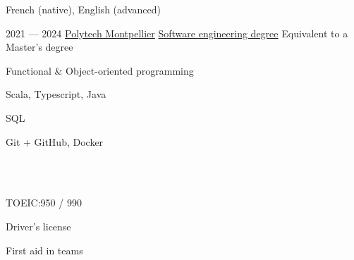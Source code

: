 \begin{SideBar}{\ColorBackground}{\ColorTextSide}

  \vspace{0.25cm}
  French (native), English (advanced)
  \vspace{0.5cm}

  \ExperienceSmall%
  {2021 --- 2024}%
  {\href{https://english.polytech.umontpellier.fr/}{Polytech Montpellier}}%
  {\href{https://www.polytech.umontpellier.fr/images/ecole/Plaquettes/SPECIALITE_IG_2018_EN.pdf}{Software engineering degree}}%
  {Equivalent to a Master's degree}

  \begin{ItemList}{\ColorHighlight}
    \item[\faBrain] Functional \& Object-oriented programming
    \item[\faLaptopCode] Scala, Typescript, Java
    \item[\faDatabase] SQL
    \item[\faTools] Git + GitHub, Docker
  \end{ItemList}

  \vspace{0.5\baselineskip}

  \\
  \vspace{0.25cm}
  \\
  \vspace{0.25cm}
  \vspace{0.5cm}

  \begin{ItemList}{\ColorHighlight}
    \item[\ding{72}] TOEIC:\@ 950 / 990
    \item[\ding{72}] Driver's license
    \item[\ding{72}] First aid in teams
  \end{ItemList}
  \vspace{0.5cm}


\end{SideBar}
